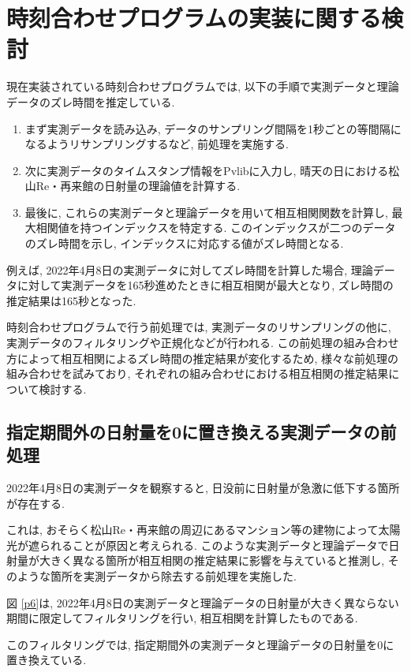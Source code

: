 \documentclass[a4j,12pt,]{jarticle}
\begin{document}
\section{時刻合わせプログラムの実装に関する検討}
現在実装されている時刻合わせプログラムでは, 以下の手順で実測データと理論データのズレ時間を推定している. 

\begin{enumerate}
\item まず実測データを読み込み, データのサンプリング間隔を1秒ごとの等間隔になるようリサンプリングするなど, 前処理を実施する. 
\item 次に実測データのタイムスタンプ情報をPvlibに入力し, 晴天の日における松山Re・再来館の日射量の理論値を計算する. 
\item 最後に, これらの実測データと理論データを用いて相互相関関数を計算し, 最大相関値を持つインデックスを特定する. このインデックスが二つのデータのズレ時間を示し, インデックスに対応する値がズレ時間となる. 
\end{enumerate}

例えば, 2022年4月8日の実測データに対してズレ時間を計算した場合, 理論データに対して実測データを165秒進めたときに相互相関が最大となり, ズレ時間の推定結果は165秒となった. 

時刻合わせプログラムで行う前処理では, 実測データのリサンプリングの他に, 実測データのフィルタリングや正規化などが行われる. この前処理の組み合わせ方によって相互相関によるズレ時間の推定結果が変化するため, 様々な前処理の組み合わせを試みており, それぞれの組み合わせにおける相互相関の推定結果について検討する. 

\subsection{指定期間外の日射量を0に置き換える実測データの前処理}
2022年4月8日の実測データを観察すると, 日没前に日射量が急激に低下する箇所が存在する. 

これは, おそらく松山Re・再来館の周辺にあるマンション等の建物によって太陽光が遮られることが原因と考えられる. このような実測データと理論データで日射量が大きく異なる箇所が相互相関の推定結果に影響を与えていると推測し, そのような箇所を実測データから除去する前処理を実施した. 

図 \ref{p6}は, 2022年4月8日の実測データと理論データの日射量が大きく異ならない期間に限定してフィルタリングを行い, 相互相関を計算したものである. 

このフィルタリングでは, 指定期間外の実測データと理論データの日射量を0に置き換えている. 
\end{document}
